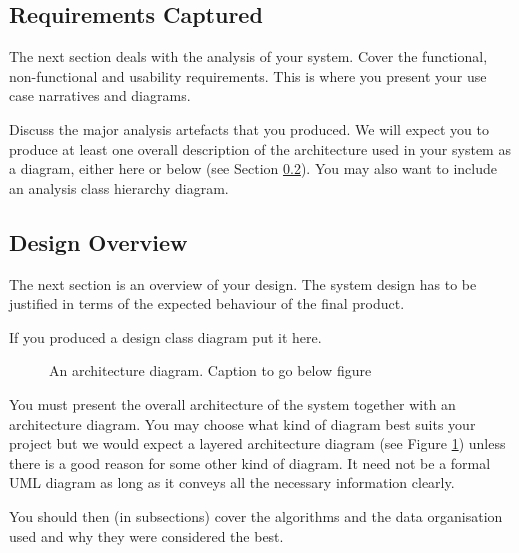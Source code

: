 \subsection{Requirements Captured}
The next section deals with the analysis of your system. Cover the
functional, non-functional and usability requirements. This is where
you present your use case narratives and diagrams. 

Discuss the major analysis artefacts that you produced. We will expect
you to produce at least one overall description of the architecture
used in your system as a diagram, either here or below (see Section
\ref{ss:design-overview}). You may also want to include an analysis
class hierarchy diagram.

\subsection{Design Overview}
\label{ss:design-overview}

The next section is an overview of your design. The system design has
to be justified in terms of the expected behaviour of the final
product. 

If you produced a design class diagram put it here.

\begin{figure}[h!]
  \caption{An architecture diagram. Caption to go below figure}
  \label{fig:architecture}
\end{figure}

You must present the overall architecture of the system together with
an architecture diagram. You may choose what kind of diagram best
suits your project but we would expect a layered architecture diagram
(see Figure \ref{fig:architecture}) unless there is a good reason for
some other kind of diagram. It need not be a formal UML diagram as
long as it conveys all the necessary information clearly.

You should then (in subsections) cover the algorithms and the data
organisation used and why they were considered the best. 

